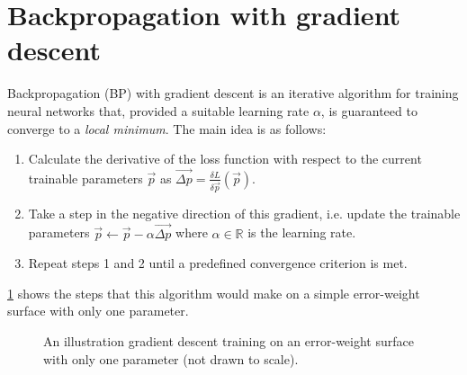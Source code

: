 \section{Backpropagation with gradient descent}
\label{sec:backpropagation}
Backpropagation (BP) with gradient descent is an iterative algorithm for training neural networks that, provided a suitable learning rate $\alpha$, is guaranteed to converge to a \textit{local minimum}.
The main idea is as follows:
\begin{enumerate}
    \item Calculate the derivative of the loss function with respect to the current trainable parameters $\vec{p}$ as
        $\vec{\Delta p} = \frac{\delta L}{\delta \vec{p}}\left(\vec{p}\right)$.
    \item Take a step in the negative direction of this gradient, i.e. update the trainable parameters $\vec{p} \leftarrow \vec{p} - \alpha \vec{\Delta p}$ where $\alpha \in \mathbb{R}$ is the learning rate.
    \item Repeat steps 1 and 2 until a predefined convergence criterion is met.
\end{enumerate}
\ref{fig:gradient_descent_local_minimum} shows the steps that this algorithm would make on a simple error-weight surface with only one parameter.
\begin{figure}
    \centering
    \caption{An illustration gradient descent training on an error-weight surface with only one parameter (not drawn to scale).}
    \label{fig:gradient_descent_local_minimum}
\end{figure}

